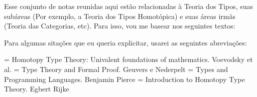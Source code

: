 \documentclass[../main.tex]{subfiles}
\begin{document}
Esse conjunto de notas reunidas aqui estão relacionadas à Teoria dos Tipos, suas subáreas (Por exemplo, a Teoria dos Tipos Homotópica) e suas áreas irmãs (Teoria das Categorias, etc). Para isso, vou me basear nos seguintes textos:

Para algumas sitações que eu queria explicitar, usarei as seguintes abreviações:

\noindent[HoTT] = Homotopy Type Theory: Univalent foundations of mathematics. Voevodsky et al. \newline
[TTFP] = Type Theory and Formal Proof. Geuvers e Nederpelt \newline
[TPL] = Types and Programming Languages. Benjamin Pierce \newline
[IHoTT] = Introduction to Homotopy Type Theory. Egbert Rijke \newline
\end{document}
